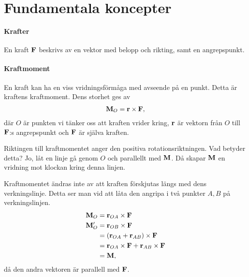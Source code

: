 \section{Fundamentala koncepter}

\paragraph{Krafter}
En kraft $\vect{F}$ beskrivs av en vektor med belopp och rikting, samt en angrepspunkt.

\paragraph{Kraftmoment}
En kraft kan ha en viss vridningsförmåga med avseende på en punkt. Detta är kraftens kraftmoment. Dens storhet ges av
\begin{align*}
	\vect{M}_O = \vect{r}\times\vect{F},
\end{align*}
där $O$ är punkten vi tänker oss att kraften vrider kring, $\vect{r}$ är vektorn från $O$ till $\vect{F}$:s angrepspunkt och $\vect{F}$ är själva kraften.

Riktingen till kraftmomentet anger den positiva rotationsriktningen. Vad betyder detta? Jo, låt en linje gå genom $O$ och parallellt med $\vect{M}$. Då skapar $\vect{M}$ en vridning mot klockan kring denna linjen.

Kraftmomentet ändras inte av att kraften förskjutas längs med dens verkningslinje. Detta ser man vid att låta den angripa i två punkter $A, B$ på verkningslinjen.
\begin{align*}
	\vect{M}_O  &= \vect{r}_{OA}\times\vect{F} \\
	\vect{M}'_O &= \vect{r}_{OB}\times\vect{F} \\
	            &= (\vect{r}_{OA} + \vect{r}_{AB})\times\vect{F} \\
	            &= \vect{r}_{OA}\times\vect{F} + \vect{r}_{AB}\times\vect{F}\\
	            &= \vect{M},
\end{align*}
då den andra vektoren är parallell med $\vect{F}$.

